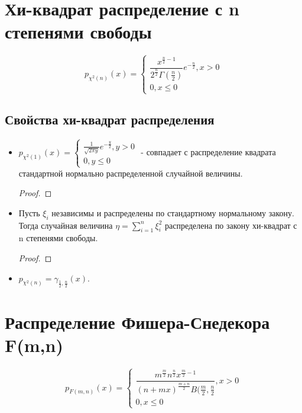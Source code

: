 \section{Хи-квадрат распределение с n степенями свободы}

\begin{definition}
  \[
    p_{\chi^2(n)} (x) = \begin{cases}
       \dfrac{x^{\frac{n}{2} - 1}}{2^\frac{n}{2} \Gamma(\frac{n}{2})} e^{-\frac{n}{2}}, x>0 \\
       0, x\leqslant 0
    \end{cases}
  \]
\end{definition}

\subsection{Свойства хи-квадрат распределения}

\begin{itemize}
  \item $p_{\chi^2(1)} (x) = \begin{cases}
      \frac{1}{\sqrt{2\pi y}} e^{-\frac{y}{2}}, y>0 \\
      0, y\leqslant 0
    \end{cases}$ - совпадает с распределение квадрата стандартной нормально распределенной случайной величины.
    
    \begin{proof}
    
    \end{proof}

  \item Пусть $\xi_i$ независимы и распределены по стандартному нормальному закону. Тогда случайная величина $\eta = \sum_{i=1}^n \xi_i^2$ распределена по закону хи-квадрат с n степенями свободы.
  
    \begin{proof}
    \end{proof}

  \item $p_{\chi^2(n)} = \gamma_{\frac{1}{2}, \frac{n}{2}} (x)$.
\end{itemize}

\section{Распределение Фишера-Снедекора F(m,n)}

\begin{definition}
  \[
    p_{F(m, n)} (x) = \begin{cases}
      \dfrac{m^\frac{m}{2} n^\frac{n}{2} x^{\frac{m}{2}-1}}{(n+mx)^\frac{m+n}{2} B(\frac{m}{2}, \frac{n}{2}}, x>0 \\
      0, x\leqslant 0
    \end{cases}
  \]
\end{definition}


